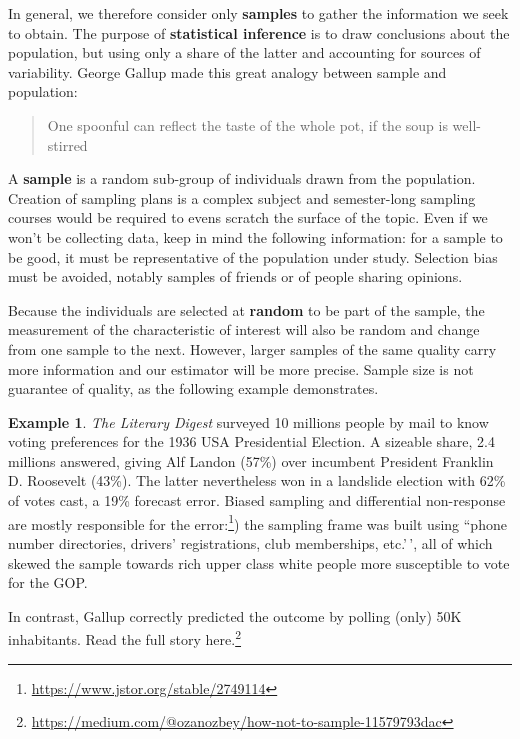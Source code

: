 \documentclass[
  11pt,
  letterpaper,
]{book}
\renewcommand{\href}[2]{#2\footnote{\url{#1}}}
\theoremstyle{definition}
\theoremstyle{definition}
\newtheorem{example}{Example}[chapter]
\theoremstyle{definition}
\theoremstyle{remark}
\begin{document}
In general, we therefore consider only \textbf{samples} to gather the information we seek to obtain. The purpose of \textbf{statistical inference} is to draw conclusions about the population, but using only a share of the latter and accounting for sources of variability. George Gallup made this great analogy between sample and population:

\begin{quote}
One spoonful can reflect the taste of the whole pot, if the soup is well-stirred
\end{quote}

A \textbf{sample} is a random sub-group of individuals drawn from the population. Creation of sampling plans is a complex subject and semester-long sampling courses would be required to evens scratch the surface of the topic. Even if we won't be collecting data, keep in mind the following information: for a sample to be good, it must be representative of the population under study. Selection bias must be avoided, notably samples of friends or of people sharing opinions.

Because the individuals are selected at \textbf{random} to be part of the sample, the measurement of the characteristic of interest will also be random and change from one sample to the next. However, larger samples of the same quality carry more information and our estimator will be more precise. Sample size is not guarantee of quality, as the following example demonstrates.

\begin{example}
\protect\hypertarget{exm:Galluppoll}{}{\label{exm:Galluppoll} }
\emph{The Literary Digest} surveyed 10 millions people by mail to know voting preferences for the 1936 USA Presidential Election. A sizeable share, 2.4 millions answered, giving Alf Landon (57\%) over incumbent President Franklin D. Roosevelt (43\%). The latter nevertheless won in a landslide election with 62\% of votes cast, a 19\% forecast error. \href{https://www.jstor.org/stable/2749114}{Biased sampling and differential non-response are mostly responsible for the error:}) the sampling frame was built using ``phone number directories, drivers' registrations, club memberships, etc.'\,', all of which skewed the sample towards rich upper class white people more susceptible to vote for the GOP.

In contrast, Gallup correctly predicted the outcome by polling (only) 50K inhabitants. \href{https://medium.com/@ozanozbey/how-not-to-sample-11579793dac}{Read the full story here.}
\end{example}
\end{document}
